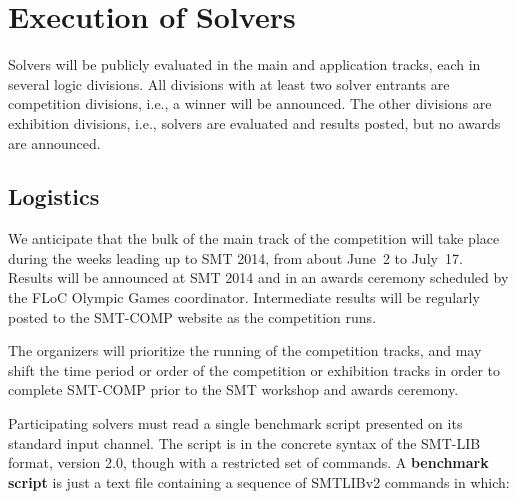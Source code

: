 \documentclass[12pt]{article}
\begin{document}
\section{Execution of Solvers}
\label{sec:exec}

Solvers will be publicly evaluated in the main and application tracks, each in several logic divisions. 
All divisions with at least two solver entrants are competition divisions, i.e., a winner will be announced. The other divisions are exhibition divisions, i.e., solvers are evaluated and results posted, but no awards are announced.

\subsection{Logistics}

%
We anticipate that the bulk of the main track of the competition will take place during
the weeks leading up to SMT 2014, from about June~2 to July~17.  Results will be
announced at SMT 2014 and in an awards ceremony scheduled by the FLoC Olympic Games coordinator.
  Intermediate results
will be regularly posted to the SMT-COMP website as the competition
runs.


The organizers will prioritize the running of the competition tracks, and may shift the
time period or order of the competition or exhibition tracks in order to complete SMT-COMP
prior to the SMT workshop and awards ceremony.

%
Participating solvers must read a single benchmark script presented on its standard input
channel. The script is in the concrete syntax of the SMT-LIB format,
version 2.0, though with a restricted set of commands.   A
\textbf{benchmark script} is just a text file containing a sequence of SMTLIBv2 commands in which:
\end{document}
